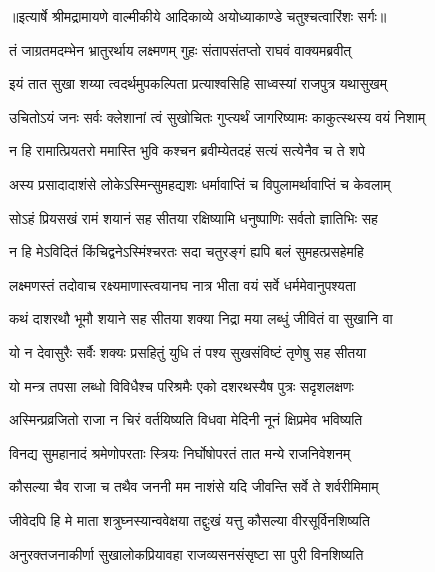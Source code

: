 {॥इत्यार्षे श्रीमद्रामायणे वाल्मीकीये आदिकाव्ये अयोध्याकाण्डे चतुश्चत्वारिंशः सर्गः॥}


\twolineshloka
{तं जाग्रतमदम्भेन भ्रातुरर्थाय लक्ष्मणम्}
{गुहः संतापसंतप्तो राघवं वाक्यमब्रवीत्} %

\twolineshloka
{इयं तात सुखा शय्या त्वदर्थमुपकल्पिता}
{प्रत्याश्वसिहि साध्वस्यां राजपुत्र यथासुखम्} %

\twolineshloka
{उचितोऽयं जनः सर्वः क्लेशानां त्वं सुखोचितः}
{गुप्त्यर्थं जागरिष्यामः काकुत्स्थस्य वयं निशाम्} %

\twolineshloka
{न हि रामात्प्रियतरो ममास्ति भुवि कश्चन}
{ब्रवीम्येतदहं सत्यं सत्येनैव च ते शपे} %

\twolineshloka
{अस्य प्रसादादाशंसे लोकेऽस्मिन्सुमहद्यशः}
{धर्मावाप्तिं च विपुलामर्थावाप्तिं च केवलाम्} %

\twolineshloka
{सोऽहं प्रियसखं रामं शयानं सह सीतया}
{रक्षिष्यामि धनुष्पाणिः सर्वतो ज्ञातिभिः सह} %

\twolineshloka
{न हि मेऽविदितं किंचिद्वनेऽस्मिंश्चरतः सदा}
{चतुरङ्गं ह्यपि बलं सुमहत्प्रसहेमहि} %

\twolineshloka
{लक्ष्मणस्तं तदोवाच रक्ष्यमाणास्त्वयानघ}
{नात्र भीता वयं सर्वे धर्ममेवानुपश्यता} %

\twolineshloka
{कथं दाशरथौ भूमौ शयाने सह सीतया}
{शक्या निद्रा मया लब्धुं जीवितं वा सुखानि वा} %

\twolineshloka
{यो न देवासुरैः सर्वैः शक्यः प्रसहितुं युधि}
{तं पश्य सुखसंविष्टं तृणेषु सह सीतया} %

\twolineshloka
{यो मन्त्र तपसा लब्धो विविधैश्च परिश्रमैः}
{एको दशरथस्यैष पुत्रः सदृशलक्षणः} %

\twolineshloka
{अस्मिन्प्रव्रजितो राजा न चिरं वर्तयिष्यति}
{विधवा मेदिनी नूनं क्षिप्रमेव भविष्यति} %

\twolineshloka
{विनद्य सुमहानादं श्रमेणोपरताः स्त्रियः}
{निर्घोषोपरतं तात मन्ये राजनिवेशनम्} %

\twolineshloka
{कौसल्या चैव राजा च तथैव जननी मम}
{नाशंसे यदि जीवन्ति सर्वे ते शर्वरीमिमाम्} %

\twolineshloka
{जीवेदपि हि मे माता शत्रुघ्नस्यान्ववेक्षया}
{तद्दुःखं यत्तु कौसल्या वीरसूर्विनशिष्यति} %

\twolineshloka
{अनुरक्तजनाकीर्णा सुखालोकप्रियावहा}
{राजव्यसनसंसृष्टा सा पुरी विनशिष्यति} %


